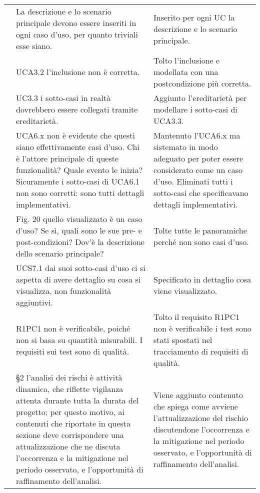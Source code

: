 {\begin{longtable}{ C{2.2cm} C{6cm} C{6cm}}
		\AdR & La descrizione e lo scenario principale devono essere inseriti in ogni caso d’uso, per quanto triviali esse siano. & Inserito per ogni UC la descrizione e lo scenario principale.\\
		
		\AdR & UCA3.2 l’inclusione non è corretta. & Tolto l'inclusione e modellata con una postcondizione più corretta.\\
		
		\AdR & UC3.3 i sotto-casi in realtà dovrebbero essere collegati tramite ereditarietà. & Aggiunto l'ereditarietà per modellare i sotto-casi di UCA3.3.\\
		
		\AdR & UCA6.x non è evidente che questi siano effettivamente casi d’uso. Chi è
		l’attore principale di queste funzionalità? Quale evento le inizia? Sicuramente
		i sotto-casi di UCA6.1 non sono corretti: sono tutti dettagli implementativi. & Mantenuto l'UCA6.x ma sistemato in modo adeguato per poter essere considerato come un caso d'uso. Eliminati tutti i sotto-casi che specificavano dettagli implementativi.\\
		
		\AdR & Fig. 20 quello visualizzato è un caso d’uso? Se sì, quali sono le sue pre- e	post-condizioni? Dov’è la descrizione dello scenario principale? & Tolte tutte le panoramiche perché non sono casi d'uso.\\
		
		\AdR & UCS7.1 dai suoi sotto-casi d’uso ci si aspetta di avere dettaglio su cosa si visualizza, non funzionalità aggiuntivi. & Specificato in dettaglio cosa viene visualizzato. \\
		
		\AdR &  R1PC1 non è verificabile, poiché non si basa su quantità misurabili. I requisiti sui test sono di qualità. & Tolto il requisito R1PC1 non è verificabile i test sono stati spostati nel tracciamento di requisiti di qualità.\\
		
		\PdP & §2 l’analisi dei rischi è attività dinamica, che riflette vigilanza attenta durante tutta la durata del progetto; per questo motivo, ai contenuti che riportate in questa sezione deve corrispondere una attualizzazione che ne discuta l’occorrenza e la mitigazione nel periodo osservato, e l’opportunità di
		raffinamento dell’analisi. & Viene aggiunto contenuto che spiega come avviene l'attualizzazione del rischio discutendone l’occorrenza e la mitigazione nel periodo osservato, e l’opportunità di raffinamento dell’analisi.\\
		

\end{longtable}}

